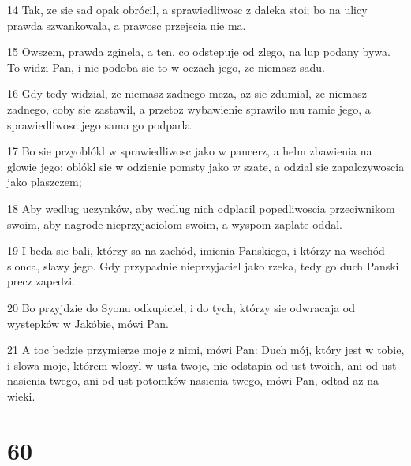 \par 14 Tak, ze sie sad opak obrócil, a sprawiedliwosc z daleka stoi; bo na ulicy prawda szwankowala, a prawosc przejscia nie ma.
\par 15 Owszem, prawda zginela, a ten, co odstepuje od zlego, na lup podany bywa. To widzi Pan, i nie podoba sie to w oczach jego, ze niemasz sadu.
\par 16 Gdy tedy widzial, ze niemasz zadnego meza, az sie zdumial, ze niemasz zadnego, coby sie zastawil, a przetoz wybawienie sprawilo mu ramie jego, a sprawiedliwosc jego sama go podparla.
\par 17 Bo sie przyoblókl w sprawiedliwosc jako w pancerz, a helm zbawienia na glowie jego; oblókl sie w odzienie pomsty jako w szate, a odzial sie zapalczywoscia jako plaszczem;
\par 18 Aby wedlug uczynków, aby wedlug nich odplacil popedliwoscia przeciwnikom swoim, aby nagrode nieprzyjaciolom swoim, a wyspom zaplate oddal.
\par 19 I beda sie bali, którzy sa na zachód, imienia Panskiego, i którzy na wschód slonca, slawy jego. Gdy przypadnie nieprzyjaciel jako rzeka, tedy go duch Panski precz zapedzi.
\par 20 Bo przyjdzie do Syonu odkupiciel, i do tych, którzy sie odwracaja od wystepków w Jakóbie, mówi Pan.
\par 21 A toc bedzie przymierze moje z nimi, mówi Pan: Duch mój, który jest w tobie, i slowa moje, którem wlozyl w usta twoje, nie odstapia od ust twoich, ani od ust nasienia twego, ani od ust potomków nasienia twego, mówi Pan, odtad az na wieki.

\chapter{60}

